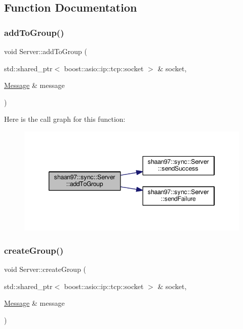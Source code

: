 \subsection{Function Documentation}
\mbox{\label{group___message_handling_gaeb034e1663dff12c80bf7661f6216fe7}} 
\subsubsection{\texorpdfstring{add\+To\+Group()}{addToGroup()}}
{\footnotesize\ttfamily void Server\+::add\+To\+Group (\begin{DoxyParamCaption}\item[{std\+::shared\+\_\+ptr$<$ boost\+::asio\+::ip\+::tcp\+::socket $>$ \&}]{socket,  }\item[{\hyperlink{structshaan97_1_1sync_1_1_message}{Message} \&}]{message }\end{DoxyParamCaption})\hspace{0.3cm}{\ttfamily [private]}}

Here is the call graph for this function\+:\nopagebreak
\begin{figure}[H]
\begin{center}
\leavevmode
\includegraphics[width=346pt]{group___message_handling_gaeb034e1663dff12c80bf7661f6216fe7_cgraph}
\end{center}
\end{figure}
\mbox{\label{group___message_handling_ga81c419040ae028471a5737c4c0c50e3f}} 
\subsubsection{\texorpdfstring{create\+Group()}{createGroup()}}
{\footnotesize\ttfamily void Server\+::create\+Group (\begin{DoxyParamCaption}\item[{std\+::shared\+\_\+ptr$<$ boost\+::asio\+::ip\+::tcp\+::socket $>$ \&}]{socket,  }\item[{\hyperlink{structshaan97_1_1sync_1_1_message}{Message} \&}]{message }\end{DoxyParamCaption})\hspace{0.3cm}{\ttfamily [private]}}

